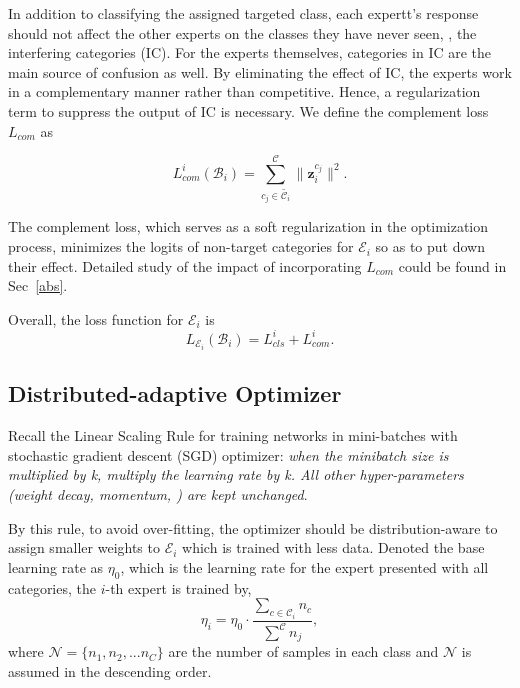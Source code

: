 In addition to classifying the assigned targeted class, each expertt’s response should not affect the other experts on the classes they have never seen, \ie, the interfering categories (IC). For the experts themselves, categories in IC are the main source of confusion as well. By eliminating the effect of IC, the experts work in a complementary manner rather than competitive. Hence, a regularization term to suppress the output of IC is necessary. We define the complement loss $L_{com}$ as

\begin{equation}
    L_{com}^i(\mathcal{B}_i)=\sum ^{\mathcal{C}}_{c_j \in \widetilde{\mathcal{C}_i}} \|\textbf{z}_i^{c_j}\|^2.
\end{equation}

The complement loss, which serves as a soft regularization in the optimization process, minimizes the logits of non-target categories for $\mathcal{E}_i$ so as to put down their effect. Detailed study of the impact of incorporating $L_{com}$ could be found in Sec~\ref{abs}.

Overall, the loss function for $\mathcal{E}_i$ is
\begin{equation}
    L_{\mathcal{E}_i}(\mathcal{B}_i)= L_{cls}^i + L_{com}^i.
\end{equation}

\subsection{Distributed-adaptive Optimizer}
Recall the Linear Scaling Rule \cite{goyal2017accurate} for training networks in mini-batches with stochastic gradient descent (SGD) optimizer: \textit{when the minibatch size is multiplied by k, multiply the learning rate by k. All other hyper-parameters (weight decay, momentum, \etc) are kept unchanged}. 

By this rule, to avoid over-fitting, the optimizer should be distribution-aware to assign smaller weights to $\mathcal{E}_i$ which is trained with less data. Denoted the base learning rate as $\eta_0$, which is the learning rate for the expert presented with all categories, the $i$-th expert is trained by,
\begin{equation}
    \eta_i = \eta_0 \cdot \frac{\sum_{c \in \mathcal{C}_i} {n_c}}{\sum^{\mathcal{C}} {n_j}},
\end{equation}
where $\mathcal{N}=\{n_1, n_2,... n_{C}\}$ are the number of samples in each class and $\mathcal{N}$ is assumed in the descending order. 

